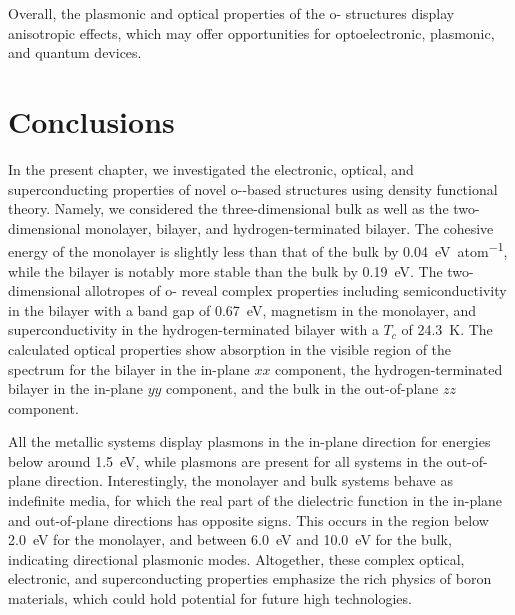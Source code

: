Overall, the plasmonic and optical properties of the o- structures display anisotropic effects,
which may offer opportunities for optoelectronic,
plasmonic, and quantum devices.

\section{Conclusions}
\label{2_conclusions}

In the present chapter, we investigated the electronic, optical,
and superconducting properties of novel o--based structures using density functional theory.
Namely, we considered the three-dimensional bulk as well as the two-dimensional monolayer,
bilayer, and hydrogen-terminated bilayer.
The cohesive energy of the monolayer is slightly less than that of the bulk by \qty{0.04}{\electronvolt\per atom},
while the bilayer is notably more stable than the bulk by \qty{0.19}{\electronvolt}.
The two-dimensional allotropes of o- reveal complex properties including semiconductivity in the bilayer with a band gap of \qty{0.67}{\electronvolt},
magnetism in the monolayer, and superconductivity in the hydrogen-terminated bilayer with a $T_c$ of \qty{24.3}{K}.
The calculated optical properties show absorption in the visible region of the spectrum for the bilayer in the in-plane $xx$ component,
the hydrogen-terminated bilayer in the in-plane $yy$ component,
and the bulk in the out-of-plane $zz$ component.

All the metallic systems display plasmons in the in-plane direction for energies below around \qty{1.5}{\electronvolt},
while plasmons are present for all systems in the out-of-plane direction.
Interestingly, the monolayer and bulk systems behave as indefinite media,
for which the real part of the dielectric function in the in-plane and out-of-plane directions has opposite signs.
This occurs in the region below \qty{2.0}{\electronvolt} for the monolayer,
and between \qty{6.0}{\electronvolt} and \qty{10.0}{\electronvolt} for the bulk,
indicating directional plasmonic modes.
Altogether, these complex optical, electronic,
and superconducting properties emphasize the rich physics of boron materials,
which could hold potential for future high technologies.

